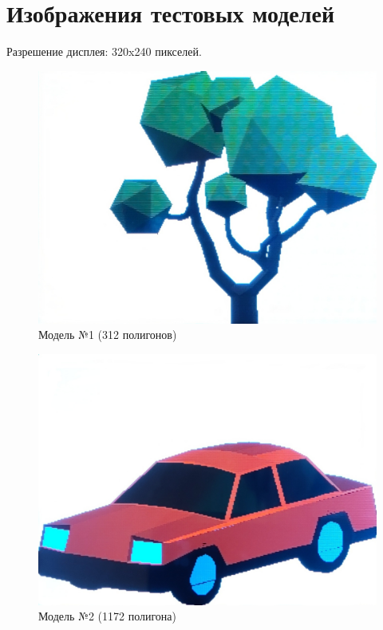 \chapter{Изображения тестовых моделей}
\label{cha:appendix4}
Разрешение дисплея: 320x240 пикселей.

\begin{figure}[h]
	\centering
	\includegraphics[scale=0.2 ]{img/models/tree.jpg}
	\caption{Модель №1 (312 полигонов)}
	\label{fig:tree_img}
\end{figure}

\begin{figure}[h]
	\centering
	\includegraphics[scale=0.2 ]{img/models/car.jpg}
	\caption{Модель №2 (1172 полигона)}
	\label{fig:car_img}
\end{figure}

